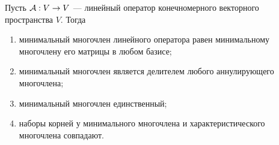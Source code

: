 \begin{lemma}
    Пусть $\mathcal{A}: V \to V$ --- линейный оператор конечномерного векторного пространства $V$. Тогда
    \begin{enumerate}[nolistsep]
        \item минимальный многочлен линейного оператора равен минимальному многочлену его матрицы в любом базисе;
        \item минимальный многочлен является делителем любого аннулирующего многочлена;
        \item минимальный многочлен единственный;
        \item наборы корней у минимального многочлена и характеристического многочлена совпадают.
    \end{enumerate}
\end{lemma}


